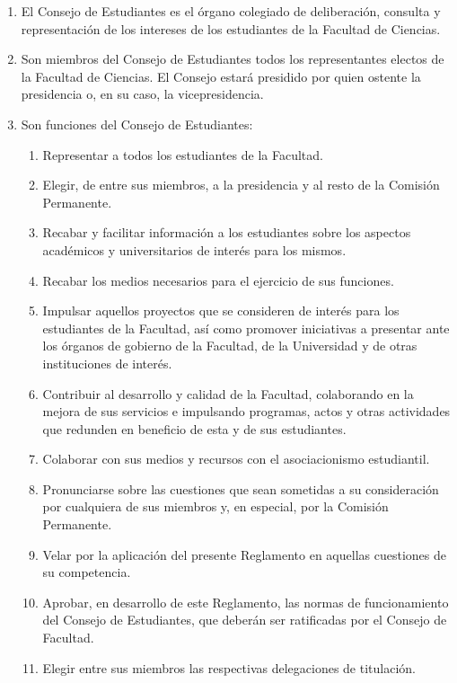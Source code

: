 \documentclass[11pt,a4paper]{article}
\begin{document}

\begin{enumerate}
\item El Consejo de Estudiantes es el órgano colegiado de deliberación, consulta y representación de los intereses de los estudiantes de la Facultad de Ciencias.
\item Son miembros del Consejo de Estudiantes todos los representantes electos de la Facultad de Ciencias. El Consejo estará presidido por quien ostente la presidencia o, en su caso, la vicepresidencia.
\item Son funciones del Consejo de Estudiantes:
  \begin{enumerate}
    \item Representar a todos los estudiantes de la Facultad.
    \item Elegir, de entre sus miembros, a la presidencia y al resto de la Comisión Permanente.
    \item Recabar y facilitar información a los estudiantes sobre los aspectos académicos y universitarios de interés para los mismos.
    \item Recabar los medios necesarios para el ejercicio de sus funciones.
    \item Impulsar aquellos proyectos que se consideren de interés para los estudiantes de la Facultad, así como promover iniciativas a presentar ante los órganos de gobierno de la Facultad, de la Universidad y de otras instituciones de interés.
    \item Contribuir al desarrollo y calidad de la Facultad, colaborando en la mejora de sus servicios e impulsando programas, actos y otras actividades que redunden en beneficio de esta y de sus estudiantes.
    \item Colaborar con sus medios y recursos con el asociacionismo estudiantil.
    \item Pronunciarse sobre las cuestiones que sean sometidas a su consideración por cualquiera de sus miembros y, en especial, por la Comisión Permanente.
    \item Velar por la aplicación del presente Reglamento en aquellas cuestiones de su competencia.
    \item Aprobar, en desarrollo de este Reglamento, las normas de funcionamiento del Consejo de Estudiantes, que deberán ser ratificadas por el Consejo de Facultad.
    \item Elegir entre sus miembros las respectivas delegaciones de titulación.

\end{enumerate}
\end{enumerate}
\end{document}
